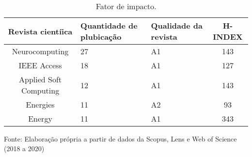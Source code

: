 \begin{table}[H]
	\centering
	\caption{Fator de impacto.}\label{tb2}
	\begin{tabular}{@{}cp{3cm}p{3cm}c@{}}
		\toprule
		Revista cientíica      & Quantidade de plubicação & Qualidade da revista & H-INDEX \\\midrule
		Neurocomputing         & 27                         & A1                     & 143     \\
		IEEE Access            & 18                         & A1                     & 127     \\
		Applied Soft Computing & 12                         & A1                     & 143     \\
		Energies               & 11                         & A2                     & 93      \\
		Energy                 & 11                         & A1                     & 343     \\ \bottomrule
	\end{tabular}
	
	
	\vspace{0.2cm}
	Fonte: Elaboração própria a partir de dados da Scopus, Lens e Web of Science (2018 a 2020)
\end{table}